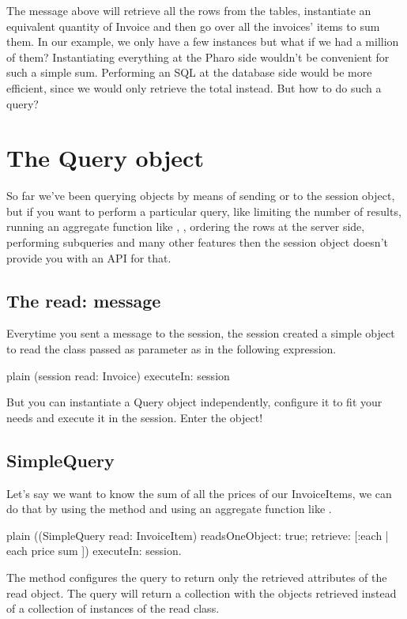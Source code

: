 \documentclass[10pt,twoside,english]{_support/latex/sbabook/sbabook}
\begin{document}
The message  above will retrieve all the rows from the tables,
instantiate an equivalent quantity of Invoice and then go over all
the invoices' items to sum them. In our example, we only have a few instances
but what if we had a million of them? Instantiating everything at the Pharo
side wouldn't be convenient for such a simple sum. Performing an SQL 
at the database side would be more efficient, since we would only retrieve
the total instead. But how to do such a query?
\chapter{The Query object}
So far we've been querying objects by means of sending  or
 to the session object, but if you want to perform
a particular query, like limiting the number of results, running an aggregate
function like , , ordering the rows at the server side,
performing subqueries and many other features then the session object
doesn't provide you with an API for that.
\section{The read: message}
Everytime you sent a  message to the session, the session created a
simple  object to read the class passed as parameter as in the following expression. 

\begin{displaycode}{plain}
(session read: Invoice) executeIn: session
\end{displaycode}

But you can instantiate a Query object independently, configure it to fit your needs and
execute it in the session. Enter the  object! 
\section{SimpleQuery}
Let's say we want to know the sum of all the prices of our InvoiceItems,
we can do that by using the  method and using an aggregate function
like .

\begin{displaycode}{plain}
((SimpleQuery read: InvoiceItem)
	readsOneObject: true;
	retrieve: [:each | each price sum ]) executeIn: session.
\end{displaycode}

The  method configures the query to return only the retrieved attributes
of the read object. The query will return a collection with the objects
retrieved instead of a collection of instances of the read class.
\end{document}

